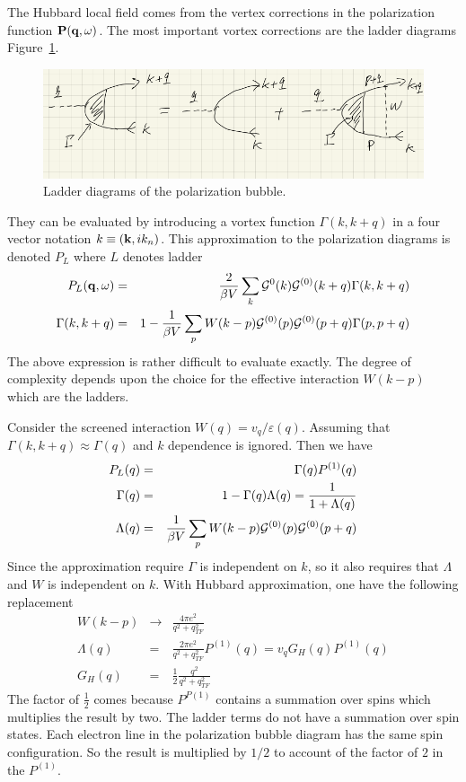 The Hubbard local field comes from the vertex corrections in the polarization function $\mathbf{P}(\mathbf{q},\omega)$.
The most important vortex corrections are the ladder diagrams Figure~\ref{fig:5.13}.
\begin{figure}[ht]
    \centering
    \includegraphics[width=0.8\linewidth]{fig/fig5_13.png}
    \caption{Ladder diagrams of the polarization bubble.}%
    \label{fig:5.13}
\end{figure}
They can be evaluated by introducing a vortex function $\Gamma(k,k+q)$ in a four vector notation $k \equiv (\mathbf{k},ik_n)$.
This approximation to the polarization diagrams is denoted $P_L$ where $L$ denotes ladder
\begin{eqnarray}
    P_L(\mathbf{q},\omega) &=& \frac{2}{\beta V}  \sum_k \mathcal{G}^{0}(k) \mathcal{G}^{(0)}(k+q) \Gamma(k,k+q) \\ \label{5.190}
    \Gamma(k,k+q) &=& 1 - \frac{1}{\beta V} \sum_p W(k-p) \mathcal{G}^{(0)}(p) \mathcal{G}^{(0)}(p+q) \Gamma(p,p+q) \nonumber
\end{eqnarray}
The above expression is rather difficult to evaluate exactly.
The degree of complexity depends upon the choice for the effective interaction $W(k-p)$ which are the ladders.

Consider the screened interaction $W(q) = v_q/\varepsilon(q)$.
Assuming that $\Gamma(k,k+q) \approx \Gamma(q)$ and $k$ dependence is ignored.
Then we have
\begin{eqnarray}
    P_L(q) &=& \Gamma(q) P^{(1)}(q) \label{5.191}\\
    \Gamma(q) &=& 1 - \Gamma(q) \Lambda(q) = \frac{1}{1 + \Lambda(q)} \label{5.192}\\
    \Lambda(q) &=& \frac{1}{\beta V} \sum_p W(k-p) \mathcal{G}^{(0)}(p) \mathcal{G}^{(0)}(p+q)  \label{5.193}
\end{eqnarray}
Since the approximation require $\Gamma$ is independent on $k$, so it also requires that $\Lambda$ and $W$ is independent on $k$.
With Hubbard approximation, one have the following replacement
\begin{eqnarray}
    W(k-p) &\to& \frac{4 \pi e^2}{q^2 + q^2_{TF}}   \label{5.194}\\
    \Lambda(q) &=& \frac{2 \pi e^2}{q^2 + q^2_{TF} } P^{(1)}(q) = v_q G_H(q) P^{(1)}(q)  \label{5.195}   \\
    G_H(q) &=& \frac{1}{2} \frac{q^2}{q^2 + q^2_{TF}}   \label{5.196}
\end{eqnarray}
The factor of $\frac{1}{2}$ comes because $P^{P(1)}$ contains a summation over spins which multiplies the result by two.
The ladder terms do not have a summation over spin states.
Each electron line in the polarization bubble diagram has the same spin configuration.
So the result is multiplied by $1/2$ to account of the factor of $2$ in the $P^{(1)}$.
